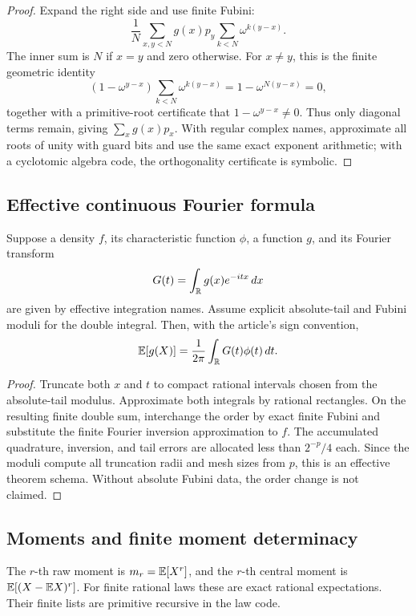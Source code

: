 \begin{proof}
Expand the right side and use finite Fubini:
\[
 \frac1N\sum_{x,y<N}g(x)p_y
       \sum_{k<N}\omega^{k(y-x)}.
\]
The inner sum is \(N\) if \(x=y\) and zero otherwise.  For \(x\ne y\), this
is the finite geometric identity
\[
 (1-\omega^{y-x})\sum_{k<N}\omega^{k(y-x)}
 =1-\omega^{N(y-x)}=0,
\]
together with a primitive-root certificate that
\(1-\omega^{y-x}\ne0\).  Thus only diagonal terms remain, giving
\(\sum_xg(x)p_x\).  With regular complex names, approximate all roots of unity
with guard bits and use the same exact exponent arithmetic; with a cyclotomic
algebra code, the orthogonality certificate is symbolic.
\end{proof}

\subsection{Effective continuous Fourier formula}

\begin{theorem}
\label{thm:continuous-fourier}
Suppose a density \(f\), its characteristic function \(\phi\), a function
\(g\), and its Fourier transform
\[
 G(t)=\int_{\mathbb R}g(x)e^{-itx}\,dx
\]
are given by effective integration names.  Assume explicit absolute-tail and
Fubini moduli for the double integral.  Then, with the article's sign
convention,
\[
 \mathbb E[g(X)]=\frac1{2\pi}\int_{\mathbb R}G(t)\phi(t)\,dt.
\]
\end{theorem}

\begin{proof}
Truncate both \(x\) and \(t\) to compact rational intervals chosen from the
absolute-tail modulus.  Approximate both integrals by rational rectangles.
On the resulting finite double sum, interchange the order by exact finite
Fubini and substitute the finite Fourier inversion approximation to \(f\).
The accumulated quadrature, inversion, and tail errors are allocated less than
\(2^{-p}/4\) each.  Since the moduli compute all truncation radii and mesh
sizes from \(p\), this is an effective theorem schema.  Without absolute
Fubini data, the order change is not claimed.
\end{proof}

\subsection{Moments and finite moment determinacy}

\begin{definition}[Moments]
The \(r\)-th raw moment is \(m_r=\mathbb E[X^r]\), and the \(r\)-th central moment is
\(\mathbb E[(X-\mathbb E X)^r]\).  For finite rational laws these are exact rational
expectations.  Their finite lists are primitive recursive in the law code.
\end{definition}

